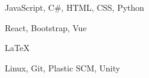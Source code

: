 \documentclass[11pt]{spidercv}
\begin{document}
    \begin{SideBar}{\ColorBackground}{\ColorTextSide}
        
        
        
        \vspace*{1cm}

        \begin{ItemList}{\ColorHighlight}
            \item [\faCode] JavaScript, C\#, HTML, CSS, Python 
            \item [\faCubes] React, Bootstrap, Vue 
            \item [\faPencilSquareO] {\LaTeX} 
            \item [\faGear] Linux, Git, Plastic SCM, Unity 
        \end{ItemList}

        \vspace*{1cm}


        \begin{SpiderDiagram}{\ColorTextSide}{\ColorHighlight}
        \end{SpiderDiagram}

        \vspace*{1cm}


        \begin{SkillGauges}{\ColorHighlight}
        \end{SkillGauges}
    \end{SideBar}

    

\end{document}
